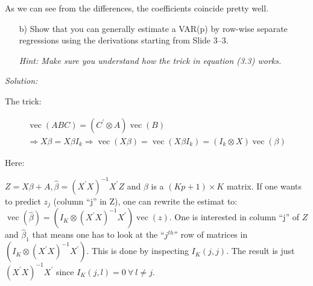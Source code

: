 \documentclass[12pt,a4paper]{article}
\renewcommand{\vec}{\operatorname{vec}}
\begin{document}
As we can see from the differences, the coefficients coincide pretty
well.

\begin{itemize}
    \item[b)]Show that you can generally estimate a VAR(p) by row-wise separate regressions using the derivations starting from Slide 3–3.
    \item[]  \textit{Hint: Make sure you understand how the trick in equation (3.3) works.}
\end{itemize}

\emph{Solution:}

The trick:

\begin{align*}
  \vec(ABC) = (C^{'} \otimes A) \vec(B)\\
  \Rightarrow X \beta = X \beta I_k \Rightarrow \vec(X \beta) = \vec(X \beta I_k) = (I_k \otimes X) \vec(\beta)
\end{align*}

Here:

\(Z = X \beta + A, \widehat{\beta} = \left( X^{'} X \right)^{-1} X^{'} Z\)
and \(\beta\) is a \((K p +1) \times K\) matrix. If one wants to predict
\(z_j\) (column \enquote{j} in Z), one can rewrite the estimat to:
\(\vec \left( \widehat{\beta} \right) = \left(I_K \otimes \left( X^{'} X \right)^{-1} X^{'} \right) \vec(z)\).
One is interested in column \enquote{j} of \(Z\) and
\(\widehat{\beta}_1\) that means one has to look at the
\enquote{\(j^{th}\)} row of matrices in
\(\left(I_K \otimes \left( X^{'} X \right)^{-1} X^{'} \right)\). This is
done by inspecting \(I_K (j,j)\). The result is just
\(\left( X^{'} X \right)^{-1} X^{'}\) since
\(I_K (j,l) = 0 \ \forall \ l \neq j\).
\end{document}
